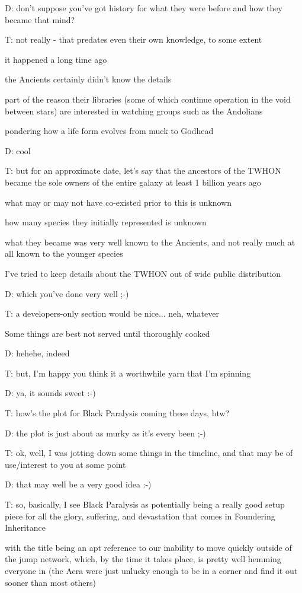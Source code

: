 D: don't suppose you've got history for what they were before and how they became that mind?

T: not really - that predates even their own knowledge, to some extent

it happened a long time ago

the Ancients certainly didn't know the details

part of the reason their libraries (some of which continue operation in the void between stars) are interested in watching groups such as the Andolians

pondering how a life form evolves from muck to Godhead

D: cool

T: but for an approximate date, let's say that the ancestors of the TWHON became the sole owners of the entire galaxy at least 1 billion years ago

what may or may not have co-existed prior to this is unknown

how many species they initially represented is unknown

what they became was very well known to the Ancients, and not really much at all known to the younger species

I've tried to keep details about the TWHON out of wide public distribution

D: which you've done very well ;-)

T: a developers-only section would be nice... neh, whatever

Some things are best not served until thoroughly cooked

D: hehehe, indeed

T: but, I'm happy you think it a worthwhile yarn that I'm spinning

D: ya, it sounds sweet :-)

T: how's the plot for Black Paralysis coming these days, btw?

D: the plot is just about as murky as it's every been ;-)

T: ok, well, I was jotting down some things in the timeline, and that may be of use/interest to you at some point

D: that may well be a very good idea :-)

T: so, basically, I see Black Paralysis as potentially being a really good setup piece for all the glory, suffering, and devastation that comes in Foundering Inheritance

with the title being an apt reference to our inability to move quickly outside of the jump network, which, by the time it takes place, is pretty well hemming everyone in (the Aera were just unlucky enough to be in a corner and find it out sooner than most others)


